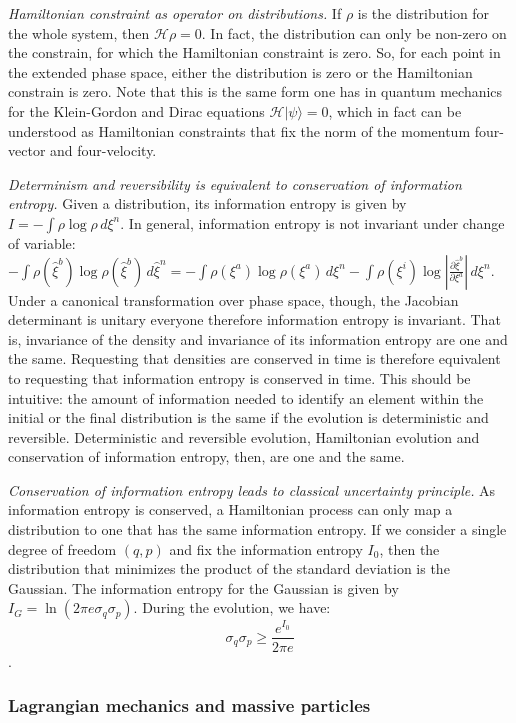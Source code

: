 \documentclass[twocolumn]{article}
\begin{document}
\emph{Hamiltonian constraint as operator on distributions.} If $\rho$ is the distribution for the whole system, then $\mathcal{H} \rho = 0$. In fact, the distribution can only be non-zero on the constrain, for which the Hamiltonian constraint is zero. So, for each point in the extended phase space, either the distribution is zero or the Hamiltonian constrain is zero. Note that this is the same form one has in quantum mechanics for the Klein-Gordon and Dirac equations $\mathcal{H} |\psi\rangle = 0$, which in fact can be understood as Hamiltonian constraints that fix the norm of the momentum four-vector and four-velocity.

\emph{Determinism and reversibility is equivalent to conservation of information entropy.} Given a distribution, its information entropy is given by $I = - \int \rho \log \rho \, d\xi^n$. In general, information entropy is not invariant under change of variable: $- \int \rho(\hat{\xi}^b) \log \rho(\hat{\xi}^b) \, d\hat{\xi}^n = - \int \rho(\xi^a) \log \rho(\xi^a) \, d\xi^n - \int \rho(\xi^i) \log \left|\frac{\partial \hat{\xi}^b}{\partial \xi^a}\right| \, d\xi^n$. Under a canonical transformation over phase space, though, the Jacobian determinant is unitary everyone therefore information entropy is invariant. That is, invariance of the density and invariance of its information entropy are one and the same. Requesting that densities are conserved in time is therefore equivalent to requesting that information entropy is conserved in time. This should be intuitive: the amount of information needed to identify an element within the initial or the final distribution is the same if the evolution is deterministic and reversible. Deterministic and reversible evolution, Hamiltonian evolution and conservation of information entropy, then, are one and the same.

\emph{Conservation of information entropy leads to classical uncertainty principle.} As information entropy is conserved, a Hamiltonian process can only map a distribution to one that has the same information entropy. If we consider a single degree of freedom $(q, p)$ and fix the information entropy $I_0$, then the distribution that minimizes the product of the standard deviation is the Gaussian. The information entropy for the Gaussian is given by $I_G = \ln (2\pi e \sigma_q \sigma_p)$. During the evolution, we have:
$$ \sigma_q \sigma_p \geq \frac{e^{I_0}}{2\pi e} $$.

\subsubsection{Lagrangian mechanics and massive particles}
\end{document}
